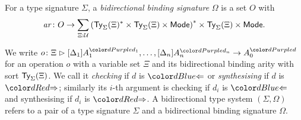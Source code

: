 \begin{definition}
  For a type signature $\Sigma$, a \emph{bidirectional binding signature} $\Omega$ is a set $O$ with
  \[
    \mathit{ar}\colon O \to \sum_{\Xi : \mathcal{U}} \left(\mathsf{Ty}_{\Sigma}(\Xi)^* \times \mathsf{Ty}_{\Sigma}(\Xi) \times {\mathsf{Mode}}\right)^* \times \mathsf{Ty}_{\Sigma}(\Xi) \times {\mathsf{Mode}}.
  \]
\end{definition}
We write $\biop$ for an operation $o$ with a variable set $\Xi$ and its bidirectional binding arity with sort $\mathsf{Ty}_{\Sigma}(\Xi)$.
We call it \emph{checking} if $d$ is ${\chk}$ or \emph{synthesising} if $d$ is ${\syn}$; similarly its $i$-th argument is checking if $d_i$ is $\chk$ and synthesising if $d_i$ is $\syn$.
A bidirectional type system $(\Sigma, \Omega)$ refers to a pair of a type signature $\Sigma$ and a bidirectional binding signature $\Omega$.

